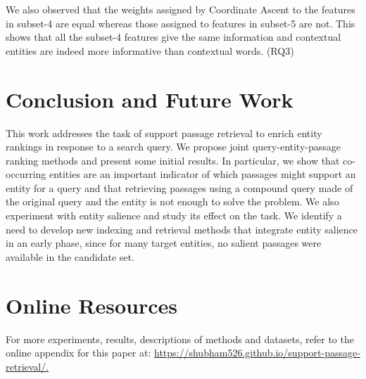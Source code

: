 \documentclass[sigconf]{acmart}
\begin{document}
We also observed that the weights assigned by Coordinate Ascent to the features in subset-4 are equal whereas those assigned to features in subset-5 are not. This shows that all the subset-4 features give the same information and contextual entities are indeed more informative than contextual words. (RQ3)
\section{Conclusion and Future Work}
\label{sec: conclusion}
This work addresses the task of support passage retrieval to enrich entity rankings in response to a search query. We propose joint query-entity-passage ranking methods and present some initial results. In particular, we show that co-occurring entities are an important indicator of which passages might support an entity for a query and that retrieving passages using a compound query made of the original query and the entity is not enough to solve the problem. We also experiment with entity salience and study its effect on the task. We identify a need to develop new indexing and retrieval methods that integrate entity salience in an early phase, since for many target entities, no salient passages were available in the candidate set.

%


\appendix

\section{Online Resources}
For more experiments, results, descriptions of methods and datasets, refer to the online appendix for this paper at:  \url{https://shubham526.github.io/support-passage-retrieval/.}
\end{document}
